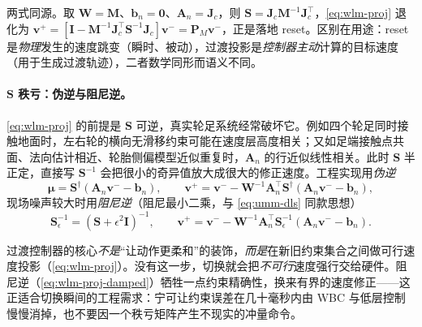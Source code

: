 \begin{note}\label{note:wlm-proj-vs-reset}
两式同源。取 $\mathbf W=\mathbf M$、$\mathbf b_n=\mathbf0$、$\mathbf A_n=\mathbf J_c$，则 $\mathbf S=\mathbf J_c\mathbf M^{-1}\mathbf J_c^\top$，\cref{eq:wlm-proj} 退化为 $\mathbf v^+=[\mathbf I-\mathbf M^{-1}\mathbf J_c^\top\mathbf S^{-1}\mathbf J_c]\mathbf v^-=\mathbf P_M\mathbf v^-$，正是落地 reset。区别在用途：reset 是\emph{物理}发生的速度跳变（瞬时、被动），过渡投影是\emph{控制器主动}计算的目标速度（用于生成过渡轨迹），二者数学同形而语义不同。
\end{note}

\paragraph{$\mathbf S$ 秩亏：伪逆与阻尼逆。}
\cref{eq:wlm-proj} 的前提是 $\mathbf S$ 可逆，真实轮足系统经常破坏它。例如四个轮足同时接触地面时，左右轮的横向无滑移约束可能在速度层高度相关；又如足端接触点共面、法向估计相近、轮胎侧偏模型近似重复时，$\mathbf A_n$ 的行近似线性相关。此时 $\mathbf S$ 半正定，直接写 $\mathbf S^{-1}$ 会把很小的奇异值放大成很大的修正速度。工程实现用\emph{伪逆}
\begin{equation}
  \boldsymbol\mu=\mathbf S^\dagger(\mathbf A_n\mathbf v^--\mathbf b_n),\qquad
  \mathbf v^+=\mathbf v^--\mathbf W^{-1}\mathbf A_n^\top\mathbf S^\dagger(\mathbf A_n\mathbf v^--\mathbf b_n),
  \label{eq:wlm-proj-pinv}
\end{equation}
现场噪声较大时用\emph{阻尼逆}（阻尼最小二乘，与 \cref{eq:umm-dls} 同款思想）
\begin{equation}
  \mathbf S_\epsilon^{-1}=(\mathbf S+\epsilon^2\mathbf I)^{-1},\qquad
  \mathbf v^+=\mathbf v^--\mathbf W^{-1}\mathbf A_n^\top\mathbf S_\epsilon^{-1}(\mathbf A_n\mathbf v^--\mathbf b_n).
  \label{eq:wlm-proj-damped}
\end{equation}

\begin{insight}\label{ins:wlm-transition-essence}
过渡控制器的核心\emph{不是}“让动作更柔和”的装饰，\emph{而是}在新旧约束集合之间做可行速度投影（\cref{eq:wlm-proj}）。没有这一步，切换就会把\emph{不可行}速度强行交给硬件。阻尼逆（\cref{eq:wlm-proj-damped}）牺牲一点约束精确性，换来有界的速度修正——这正适合切换瞬间的工程需求：宁可让约束误差在几十毫秒内由 WBC 与低层控制慢慢消掉，也不要因一个秩亏矩阵产生不现实的冲量命令。
\end{insight}

